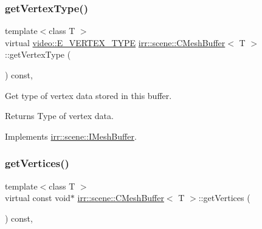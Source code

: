 \subsubsection{\texorpdfstring{get\+Vertex\+Type()}{getVertexType()}\hspace{0.1cm}{\footnotesize\ttfamily [2/2]}}
{\footnotesize\ttfamily template$<$class T $>$ \\
virtual \hyperlink{namespaceirr_1_1video_a0e3b59e025e0d0db0ed2ee0ce904deac}{video\+::\+E\+\_\+\+V\+E\+R\+T\+E\+X\+\_\+\+T\+Y\+PE} \hyperlink{classirr_1_1scene_1_1CMeshBuffer}{irr\+::scene\+::\+C\+Mesh\+Buffer}$<$ T $>$\+::get\+Vertex\+Type (\begin{DoxyParamCaption}{ }\end{DoxyParamCaption}) const\hspace{0.3cm}{\ttfamily [inline]}, {\ttfamily [virtual]}}



Get type of vertex data stored in this buffer. 

\begin{DoxyReturn}{Returns}
Type of vertex data. 
\end{DoxyReturn}


Implements \hyperlink{classirr_1_1scene_1_1IMeshBuffer_a4d7a84ae4416487736f0ed0f519bb4f0}{irr\+::scene\+::\+I\+Mesh\+Buffer}.

\mbox{\label{classirr_1_1scene_1_1CMeshBuffer_ad9463b97ee94bbc26bbb11bf867ea830}} 
\subsubsection{\texorpdfstring{get\+Vertices()}{getVertices()}\hspace{0.1cm}{\footnotesize\ttfamily [1/4]}}
{\footnotesize\ttfamily template$<$class T $>$ \\
virtual const void$\ast$ \hyperlink{classirr_1_1scene_1_1CMeshBuffer}{irr\+::scene\+::\+C\+Mesh\+Buffer}$<$ T $>$\+::get\+Vertices (\begin{DoxyParamCaption}{ }\end{DoxyParamCaption}) const\hspace{0.3cm}{\ttfamily [inline]}, {\ttfamily [virtual]}}



